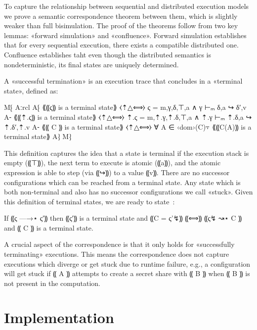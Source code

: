 To capture the relationship between sequential and distributed execution
models we prove a semantic correspondence theorem between them, which is
slightly weaker than full bisimulation. The proof of the theorems follow
from two key lemmas: «forward simulation» and «confluence». Forward simulation
establishes that for every sequential execution, there exists a compatible distributed
one. Confluence establishes taht even though the distributed semantics is nondeterministic,
its final states are uniquely determined.

A «successful termination» is an execution trace that
concludes in a «terminal state», defined as:

M⁅ Aːrcl
   A⁅ ⟪⸨ς⸩ is a terminal state⟫   ⧼⇡△⟺⧽ ς = m,γ,δ,⊤,a ∧ γ ⊢ₘ δ,a ↪ δ′,v
   A⁃ ⟪⸨⇡.ς⸩ is a terminal state⟫ ⧼⇡△⟺⧽ ⇡.ς = m,⇡.γ,⇡.δ,⊤,a ∧ ⇡.γ ⊢ₘ ⇡.δ,a ↪ ⇡.δ′,⇡.v
   A⁃ ⟪⸨ C ⸩ is a terminal state⟫   ⧼⇡△⟺⧽ ∀ A ∈ ‹dom›(C)⍪ ⟪⸨C(A)⸩ is a terminal state⟫
   A⁆
   M⁆

This definition captures the idea that a state is terminal if the execution
stack is empty (⸨⊤⸩), the next term to execute is atomic (⸨a⸩), and the
atomic expression is able to step (via ⸨↪⸩) to a value ⸨v⸩.
There are no successor configurations which can be reached from a terminal state. Any
state which is both non-terminal and also has no successor configurations we
call «stuck». Given this definition of terminal states, we are ready to
state~:

\begin{theorem}\label{thm:mpc-simulation}
  If ⸨ς —→⋆ ς′⸩ then ⸨ς′⸩ is a terminal state and ⸨C = ς'↯⸩ ⸨⟺⸩ ⸨ς↯ ↝⋆ C ⸩ and ⸨ C ⸩ is a terminal state.
\end{theorem}

A crucial aspect of the correspondence is that it only
holds for «successfully terminating» executions. This means the correspondence
 does not capture executions which diverge or get stuck due to runtime failure,
 e.g., a configuration will get stuck if ⸨ A ⸩ attempts to create a secret share
 with ⸨ B ⸩ when ⸨ B ⸩ is not present in the computation.

\section{Implementation}
\label{sec:mpc-impl}

